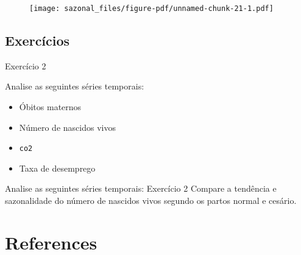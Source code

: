 \documentclass[
  letterpaper,
  DIV=11,
  numbers=noendperiod]{scrreprt}
\newlength{\cslhangindent}
\newlength{\cslentryspacingunit} %
\newenvironment{CSLReferences}[2] %
 {%
  \setlength{\parindent}{0pt}
  \ifodd #1
  \let\oldpar\par
  \def\par{\hangindent=\cslhangindent\oldpar}
  \fi
  \setlength{\parskip}{#2\cslentryspacingunit}
 }%
 {}
\begin{document}
\begin{figure}[H]

{\centering \texttt{[image: sazonal\_files/figure-pdf/unnamed-chunk-21-1.pdf]}

}

\end{figure}

\hypertarget{exercuxedcios-5}{%
\section{Exercícios}\label{exercuxedcios-5}}

Exercício 2

Analise as seguintes séries temporais:

\begin{itemize}
\item
  Óbitos maternos
\item
  Número de nascidos vivos
\item
  \texttt{co2}
\item
  Taxa de desemprego
\end{itemize}

Analise as seguintes séries temporais: Exercício 2 Compare a tendência e
sazonalidade do número de nascidos vivos segundo os partos normal e
cesário.


\hypertarget{references}{%
\chapter*{References}\label{references}}


\hypertarget{refs}{}
\begin{CSLReferences}{0}{0}
\end{CSLReferences}
\end{document}
